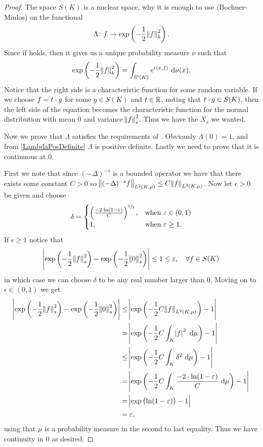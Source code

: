 \clearpage
\begin{proof}
	The space $S(K)$ is a nuclear space, why it is enough to use  (Bochner-Minlos) on the functional
	\begin{equation}
		\Lambda \colon f \to \exp\left(-\frac{1}{2} \norm{f}^2_{k}\right).
	\end{equation}
	Since if  holds, then it gives us a unique probability measure $\nu$ such that
	\begin{equation}
		\exp \left(-\frac{1}{2} \norm{f}^{2}_{k}\right) = \int_{S'(K)} e^{i \left\langle x, f \right\rangle} \ \text{d} \nu (x).
	\end{equation}
	Notice that the right side is a characteristic function for some random variable. If we choose $f= t\cdot g$ for some $g \in S(K)$ and $t \in \mathbb{R}$, noting that $t \cdot g \in S(K)$, then the left side of the equation becomes the characteristic function for the normal distribution with mean 0 and variance $\norm{f}_{s}^{2}$. Thus we have the $X_s$ we wanted.
	
	
	Now we prove that $\Lambda$ satisfies the requirements of . Obviously $\Lambda(0) = 1$, and from \cref{LambdaPosDefinite} $\Lambda$ is positive definite. Lastly we need to prove that it is continuous at 0. 
	
	First we note that since $(-\Delta)^{-s}$ is a bounded operator we have that there exists some constant $C> 0$ so $\norm{(-\Delta)^{-s}f }_{L^{2}(K, \mu)} \leq C \norm{f}_{L^{2}(K, \mu)}$. Now let $\epsilon > 0$ be given and choose $$\delta = \begin{cases}
		\left(\frac{-2\cdot \ln(1-\varepsilon)}{C}\right)^{\sfrac{1}{2}}, & \text{when } \varepsilon \in (0,1) \\
		1,& \text{when } \varepsilon \geq 1.
	\end{cases}$$
	If $\epsilon \geq 1$ notice that 
	\begin{equation}
		\abs{\exp\left(-\frac{1}{2} \norm{f}_{s}^{2}\right) - \exp\left(-\frac{1}{2} \norm{0}_{s}^{2}\right)} \leq 1 \leq \varepsilon, \quad \forall f \in S(K)
	\end{equation} 
	in which case we can choose $\delta$ to be any real number larger than $0$. Moving on to $\epsilon \in (0,1)$ we get
	\begin{align}
		\abs{\exp\left(-\frac{1}{2} \norm{f}_{s}^{2}\right) - \exp\left(-\frac{1}{2} \norm{0}_{s}^{2}\right)} &\leq \abs{\exp\left(-\frac{1}{2} C\norm{f}_{L^2(K,\mu)}\right) - 1} \\
		&= \abs{\exp\left(-\frac{1}{2} C \int_{K}\abs{f}^2 \ \text{d} \mu\right) - 1} \\
		&\leq \abs{\exp\left(-\frac{1}{2} C \int_{K} \delta^2 \ \text{d} \mu\right) - 1} \\
		&= \abs{\exp\left(-\frac{1}{2} C \int_{K} \frac{-2\cdot \ln(1-\varepsilon)}{ C} \ \text{d} \mu\right) - 1}  \\
		&= \abs{\exp\left(\ln(1-\varepsilon)\right) -1}\\
		& = \varepsilon,
	\end{align}
	using that $\mu$ is a probability measure in the second to last equality. Thus we have continuity in $0$ as desired.
\end{proof}


